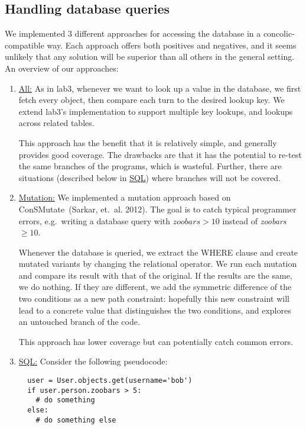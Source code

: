 \documentclass{scrartcl}
\begin{document}
\subsection{Handling database queries}

We implemented 3 different approaches for accessing the database in a
concolic-compatible way. Each approach offers both positives and
negatives, and it seems unlikely that any solution will be superior
than all others in the general setting. An overview of our approaches:

\begin{enumerate}
\item \underline{All:}
  As in lab3, whenever we want to look up a value in the database, we
  first fetch every object, then compare each turn to the desired
  lookup key. We extend lab3's implementation to support multiple key
  lookups, and lookups across related tables.

  This approach has the benefit that it is relatively simple, and
  generally provides good coverage. The drawbacks are that it has the
  potential to re-test the same branches of the programs, which is
  wasteful. Further, there are situations (described below in
  \underline{SQL}) where branches will not be covered.

\item \underline{Mutation:}
  We implemented a mutation approach based on
  ConSMutate~(Sarkar, et.\ al. 2012). The goal is to catch typical
  programmer errors, e.g.\ writing a database query with
  $\textit{zoobars} > 10$ instead of \textit{zoobars }$ \geq 10$.

  Whenever the database is queried, we extract the WHERE clause and
  create mutated variants by changing the relational operator. We run
  each mutation and compare its result with that of the original. If
  the results are the same, we do nothing. If they are different, we
  add the symmetric difference of the two conditions as a new path
  constraint: hopefully this new constraint will lead to a concrete
  value that distinguishes the two conditions, and explores an
  untouched branch of the code.

  This approach has lower coverage but can potentially catch common errors.

\item \underline{SQL:}
  Consider the following pseudocode:
  \begin{verbatim}
  user = User.objects.get(username='bob')
  if user.person.zoobars > 5:
    # do something
  else:
    # do something else
  \end{verbatim}


\end{enumerate}
\end{document}
